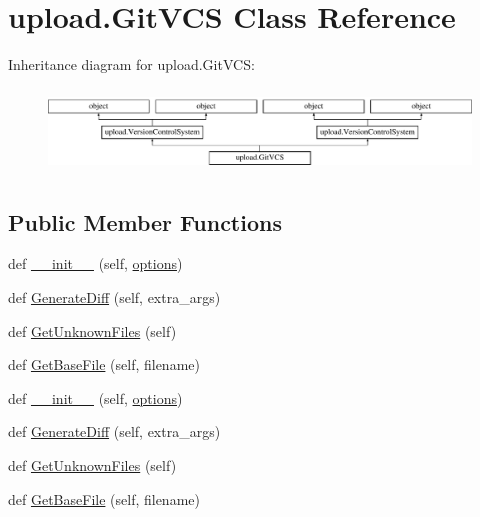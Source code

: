 \hypertarget{classupload_1_1GitVCS}{}\section{upload.\+Git\+V\+CS Class Reference}
\label{classupload_1_1GitVCS}
Inheritance diagram for upload.\+Git\+V\+CS\+:\begin{figure}[H]
\begin{center}
\leavevmode
\includegraphics[height=2.245989cm]{classupload_1_1GitVCS}
\end{center}
\end{figure}
\subsection*{Public Member Functions}
\begin{DoxyCompactItemize}
\item 
def \mbox{\hyperlink{classupload_1_1GitVCS_aba4e1dca1c4b3e5db7ba07f6bce3c839}{\+\_\+\+\_\+init\+\_\+\+\_\+}} (self, \mbox{\hyperlink{classupload_1_1VersionControlSystem_a4d57d043bc408887b94269fe4cea9556}{options}})
\item 
def \mbox{\hyperlink{classupload_1_1GitVCS_a3ebfc01cebc9b585706ad3f4389a8833}{Generate\+Diff}} (self, extra\+\_\+args)
\item 
def \mbox{\hyperlink{classupload_1_1GitVCS_ae4e8c0e9fa01619c6a5c76d1ab84b995}{Get\+Unknown\+Files}} (self)
\item 
def \mbox{\hyperlink{classupload_1_1GitVCS_a70ddb65a6b512b8cb8cc4affa37ff9b4}{Get\+Base\+File}} (self, filename)
\item 
def \mbox{\hyperlink{classupload_1_1GitVCS_aba4e1dca1c4b3e5db7ba07f6bce3c839}{\+\_\+\+\_\+init\+\_\+\+\_\+}} (self, \mbox{\hyperlink{classupload_1_1VersionControlSystem_a4d57d043bc408887b94269fe4cea9556}{options}})
\item 
def \mbox{\hyperlink{classupload_1_1GitVCS_a3ebfc01cebc9b585706ad3f4389a8833}{Generate\+Diff}} (self, extra\+\_\+args)
\item 
def \mbox{\hyperlink{classupload_1_1GitVCS_ae4e8c0e9fa01619c6a5c76d1ab84b995}{Get\+Unknown\+Files}} (self)
\item 
def \mbox{\hyperlink{classupload_1_1GitVCS_a70ddb65a6b512b8cb8cc4affa37ff9b4}{Get\+Base\+File}} (self, filename)
\end{DoxyCompactItemize}
